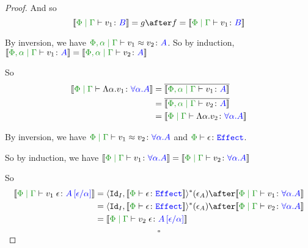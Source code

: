 \documentclass{report}
\begin{document}
\begin{framed}
\begin{proof}
        
        
        And so
        \begin{equation}
                \deno{\gpetyperelation{v_1}{B}} = g \after f = \deno{\gpetyperelation{v_1}{B}}
        \end{equation}
        
        By inversion, we have $\eberelation{\P,\a}{\G}{v_1}{v_2}{A}$. So by induction, $\deno{\etyperelation{\P,\a}{\G}{v_1}{A}} = \deno{\etyperelation{\P,\a}{\G}{v_2}{A}}$
        
        So \begin{align*}
            \deno{\gpetyperelation{\elam{\a}{v_1}}{\all{\a}{A}}} & = \bar{\deno{\etyperelation{\P,\a}{\G}{v_1}{A}}}\\
            & = \bar{\deno{\etyperelation{\P,\a}{\G}{v_2}{A}}}\\
            & = \deno{\gpetyperelation{\elam{\a}{v_2}}{\all{\a}{A}}} 
        \end{align*}
        
        
        By inversion, we have $\gpeberelation{v_1}{v_2}{\all{\a}{A}}$ and $\typerelation{\P}{\e}{\effect}$.
        
        So by induction, we have $\deno{\gpetyperelation{v_1}{\all{\a}{A}}} = \deno{\gpetyperelation{v_2}{\all{\a}{A}}}$
        
        So
        \begin{align*}
            \deno{\gpetyperelation{\eapp{v_1}{\e}}{A\ssub{\a}{\e}}} & = \pr{\Id{I}}{\deno{\typerelation{\P}{\e}{\effect}}}\star(\e_{A})\after\deno{\gpetyperelation{v_1}{\all{\a}{A}}}
            \\
            & = \pr{\Id{I}}{\deno{\typerelation{\P}{\e}{\effect}}}\star(\e_{A})\after\deno{\gpetyperelation{v_2}{\all{\a}{A}}}
            \\
            & = \deno{\gpetyperelation{\eapp{v_2}{\e}}{A\ssub{\a}{\e}}}
        \end{align*}
        $$\square$$
    \end{proof}
    
\end{framed}
    
\end{document}
